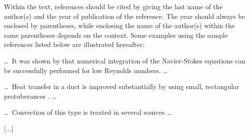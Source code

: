 \documentclass{stabs2021}
\begin{document}
Within the text, references should be cited by giving the last name of
the author(s) and the year of publication of the reference. The year
should always be enclosed by parentheses, while enclosing the name of
the author(s) within the same parentheses depends on the context. Some
examples using the sample references listed below are illustrated
hereafter:

\dots\ It was shown by \citet{kwon1981prediction} that numerical
integration of the Navier-Stokes equations can be successfully
performed for low Reynolds numbers. \dots

\dots\ Heat transfer in a duct is improved substantially by using
small, rectangular protuberances \citep{sparrow1980forced}. \dots

\dots\ Convection of this type is treated in several sources
\citep{lee1982structure, sparrow1980fluid, tung1982evaporative} \dots

[...]


\end{document}
